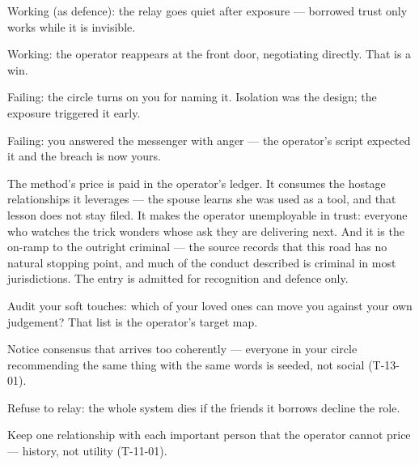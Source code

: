 \begin{feedback}
  \item Working (as defence): the relay goes quiet after exposure --- borrowed trust only works while it is invisible.
  \item Working: the operator reappears at the front door, negotiating directly. That is a win.
  \item Failing: the circle turns on you for naming it. Isolation was the design; the exposure triggered it early.
  \item Failing: you answered the messenger with anger --- the operator's script expected it and the breach is now yours.
\end{feedback}
\begin{failure}
The method's price is paid in the operator's ledger. It consumes the hostage relationships it leverages --- the spouse learns she was used as a tool, and that lesson does not stay filed. It makes the operator unemployable in trust: everyone who watches the trick wonders whose ask they are delivering next. And it is the on-ramp to the outright criminal --- the source records that this road has no natural stopping point, and much of the conduct described is criminal in most jurisdictions. The entry is admitted for recognition and defence only.
\end{failure}
\begin{countermeasures}
  \item Audit your soft touches: which of your loved ones can move you against your own judgement? That list is the operator's target map.
  \item Notice consensus that arrives too coherently --- everyone in your circle recommending the same thing with the same words is seeded, not social (T-13-01).
  \item Refuse to relay: the whole system dies if the friends it borrows decline the role.
  \item Keep one relationship with each important person that the operator cannot price --- history, not utility (T-11-01).
\end{countermeasures}

\seesources
{}

